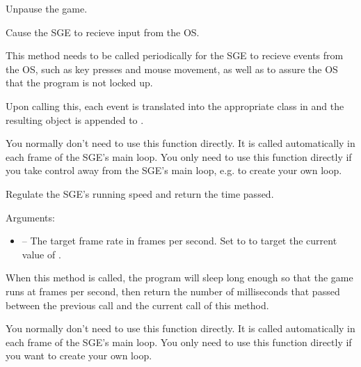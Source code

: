 \documentclass[letterpaper,10pt,english]{sphinxmanual}
\begin{document}

\begin{fulllineitems}
\label{dsp:sge.dsp.Game.unpause}
Unpause the game.

\end{fulllineitems}


\begin{fulllineitems}
\label{dsp:sge.dsp.Game.pump_input}
Cause the SGE to recieve input from the OS.

This method needs to be called periodically for the SGE to
recieve events from the OS, such as key presses and mouse
movement, as well as to assure the OS that the program is not
locked up.

Upon calling this, each event is translated into the appropriate
class in {\hyperref[input:module\string-sge.input]{\emph{}}} and the resulting object is appended
to {\hyperref[dsp:sge.dsp.Game.input_events]{\emph{}}}.

You normally don't need to use this function directly.  It is
called automatically in each frame of the SGE's main loop.  You
only need to use this function directly if you take control away
from the SGE's main loop, e.g. to create your own loop.

\end{fulllineitems}


\begin{fulllineitems}
\label{dsp:sge.dsp.Game.regulate_speed}
Regulate the SGE's running speed and return the time passed.

Arguments:
\begin{itemize}
\item {} 
 -- The target frame rate in frames per second.  Set to
 to target the current value of {\hyperref[dsp:sge.dsp.Game.fps]{\emph{}}}.

\end{itemize}

When this method is called, the program will sleep long enough
so that the game runs at  frames per second, then return
the number of milliseconds that passed between the previous call
and the current call of this method.

You normally don't need to use this function directly.  It is
called automatically in each frame of the SGE's main loop.  You
only need to use this function directly if you want to create
your own loop.

\end{fulllineitems}
\end{document}
